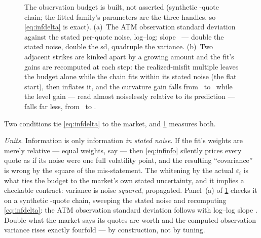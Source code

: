 \begin{figure}[htbp]
\centering
{}
\caption{The observation budget is built, not asserted (synthetic
\MacFiltCovarNq-quote chain; the fitted family's parameters are the
three handles, so \cref{eq:infdelta} is exact).  (a)~The ATM
observation standard deviation against the stated per-quote noise,
log--log: slope \MacFiltCovarSlope\ --- double the stated noise,
double the sd, quadruple the variance.  (b)~Two adjacent strikes are
kinked apart by a growing amount and the fit's gains are recomputed
at each step: the realized-misfit multiple leaves the budget alone
while the chain fits within its stated noise (the flat start), then
inflates it, and the curvature gain falls from
\MacFiltCovarGainCurvClean\ to \MacFiltCovarGainCurvKinked\ while
the level gain --- read almost noiselessly relative to its
prediction --- falls far less, from \MacFiltCovarGainLevelClean\ to
\MacFiltCovarGainLevelKinked.}
\label{fig:infcovar}
\end{figure}

Two conditions tie \cref{eq:infdelta} to the market, and
\cref{fig:infcovar} measures both.

\emph{Units.}  Information is only information \emph{in stated
noise}.  If the fit's weights are merely relative --- equal weights,
say --- then \cref{eq:infinfo} silently prices every quote as if its
noise were one full volatility point, and the resulting
``covariance'' is wrong by the square of the mis-statement.  The
whitening by the actual $\varepsilon_i$ is what ties the budget to
the market's own stated uncertainty, and it implies a checkable
contract: variance is noise \emph{squared}, propagated.  Panel~(a) of \cref{fig:infcovar} checks
it on a synthetic \MacFiltCovarNq-quote chain, sweeping the stated
noise and recomputing \cref{eq:infdelta}: the ATM observation
standard deviation follows with log--log slope \MacFiltCovarSlope.
Double what the market says its quotes are worth and the computed
observation variance rises exactly fourfold --- by construction,
not by tuning.

